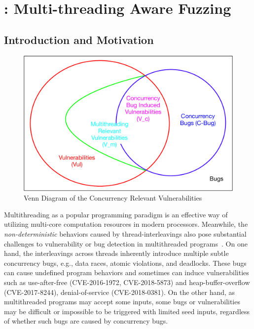 
\chapter{\mtfuzz: Multi-threading Aware Fuzzing} \label{ch:mtfuzz}

\section{Introduction and Motivation}\label{sec:mtfuzz_intro}

\begin{figure}
\begin{center}
	\includegraphics[width=0.75\columnwidth]{res/venn}
	\caption{Venn Diagram of the Concurrency Relevant Vulnerabilities}
	\label{fig:venn_con_vul}
\end{center}	
\end{figure}

Multithreading as a popular programming paradigm is an effective way of utilizing multi-core computation resources in modern processors. Meanwhile, the \emph{non-deterministic} behaviors caused by thread-interleavings also pose substantial challenges to vulnerability or bug detection in multithreaded programs~\cite{mtbugs_survey}. On one hand, the interleavings across threads inherently introduce multiple subtle concurrency bugs, e.g., data races, atomic violations, and deadlocks. These bugs can cause undefined program behaviors and sometimes can induce vulnerabilities such as use-after-free (CVE-2016-1972, CVE-2018-5873) and heap-buffer-overflow (CVE-2017-8244), denial-of-service (CVE-2018-0381). On the other hand, as multithreaded programs may accept some inputs, some bugs or vulnerabilities may be difficult or impossible to be triggered with limited seed inputs, regardless of whether such bugs are caused by concurrency bugs. 


